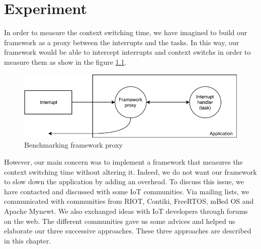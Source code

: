 \chapter{Experiment \label{chap:experiment}}

In order to measure the context switching time, we have imagined to build our framework as a proxy between the interrupts and the tasks.
In this way, our framework would be able to intercept interrupts and context switchs in order to measure them as show in the figure \ref{fig:proxy-framework}.

\begin{figure}[!ht]
  \centering
  \includegraphics[scale=1]{assets/proxy-framework.pdf}
  \caption{Benchmarking framework proxy\label{fig:proxy-framework}}
\end{figure}


However, our main concern was to implement a framework that measures the context switching time without altering it.
Indeed, we do not want our framework to slow down the application by adding an overhead.
To discuss this issue, we have contacted and discussed with some IoT communities.
Via mailing lists, we communicated with communities from RIOT, Contiki, FreeRTOS, mBed OS and Apache Mynewt.
We also exchanged ideas with IoT developers through forums on the web.
The different communities gave us some advices and helped us elaborate our three successive approaches.
These three approaches are described in this chapter.



